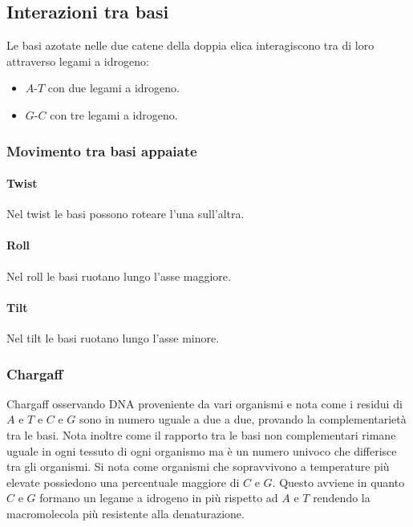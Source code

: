 	\subsection{Interazioni tra basi}
	Le basi azotate nelle due catene della doppia elica interagiscono tra di loro attraverso legami a idrogeno:
	\begin{multicols}{2}
		\begin{itemize}
			\item $A$-$T$ con due legami a idrogeno.
			\item $G$-$C$ con tre legami a idrogeno.
		\end{itemize}
	\end{multicols}

		\subsubsection{Movimento tra basi appaiate}

			\paragraph{Twist}
			Nel twist le basi possono roteare l'una sull'altra.

			\paragraph{Roll}
			Nel roll le basi ruotano lungo l'asse maggiore.

			\paragraph{Tilt}
			Nel tilt le basi ruotano lungo l'asse minore.
			
		\subsubsection{Chargaff}
		Chargaff osservando DNA proveniente da vari organismi e nota come i residui di $A$ e $T$ e $C$ e $G$ sono in numero uguale a due a due, provando la complementariet\`a tra le basi. 
		Nota inoltre come il rapporto tra le basi non complementari rimane uguale in ogni tessuto di ogni organismo ma \`e un numero univoco che differisce tra gli organismi.
		Si nota come organismi che sopravvivono a temperature pi\`u elevate possiedono una percentuale maggiore di $C$ e $G$. 
		Questo avviene in quanto $C$ e $G$ formano un legame a idrogeno in pi\`u rispetto ad $A$ e $T$ rendendo la macromolecola pi\`u resistente alla denaturazione. 

